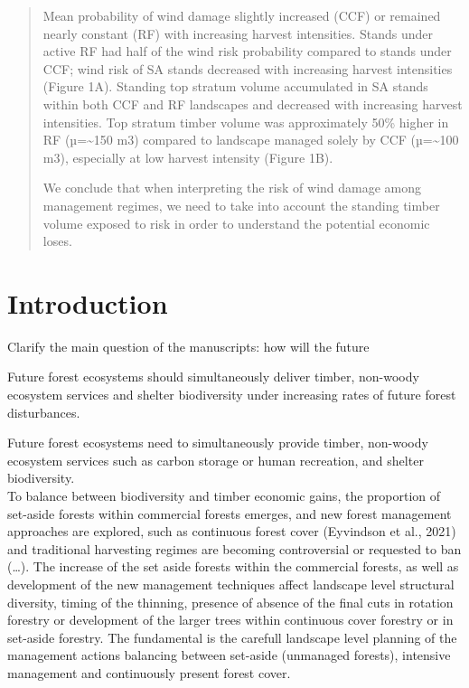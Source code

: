 \documentclass[]{elsarticle} %
\begin{document}
\begin{frontmatter}
\begin{abstract}
  Mean probability of wind damage slightly increased (CCF) or remained nearly constant (RF) with increasing harvest intensities. Stands under active RF had half of the wind risk probability compared to stands under CCF; wind risk of SA stands decreased with increasing harvest intensities (Figure 1A). Standing top stratum volume accumulated in SA stands within both CCF and RF landscapes and decreased with increasing harvest intensities. Top stratum timber volume was approximately 50\% higher in RF (µ=\textasciitilde{}150 m3) compared to landscape managed solely by CCF (µ=\textasciitilde{}100 m3), especially at low harvest intensity (Figure 1B).
  
  We conclude that when interpreting the risk of wind damage among management regimes, we need to take into account the standing timber volume exposed to risk in order to understand the potential economic loses.
  \end{abstract}
  
 \end{frontmatter}

\newpage

\hypertarget{introduction}{%
\section{Introduction}\label{introduction}}

Clarify the main question of the manuscripts: how will the future

Future forest ecosystems should simultaneously deliver timber, non-woody ecosystem services and shelter biodiversity under increasing rates of future forest disturbances.

Future forest ecosystems need to simultaneously provide timber, non-woody ecosystem services such as carbon storage or human recreation, and shelter biodiversity.\\
To balance between biodiversity and timber economic gains, the proportion of set-aside forests within commercial forests emerges, and new forest management approaches are explored, such as continuous forest cover (Eyvindson et al., 2021) and traditional harvesting regimes are becoming controversial or requested to ban (\ldots{}). The increase of the set aside forests within the commercial forests, as well as development of the new management techniques affect landscape level structural diversity, timing of the thinning, presence of absence of the final cuts in rotation forestry or development of the larger trees within continuous cover forestry or in set-aside forestry. The fundamental is the carefull landscape level planning of the management actions balancing between set-aside (unmanaged forests), intensive management and continuously present forest cover.
\end{document}
